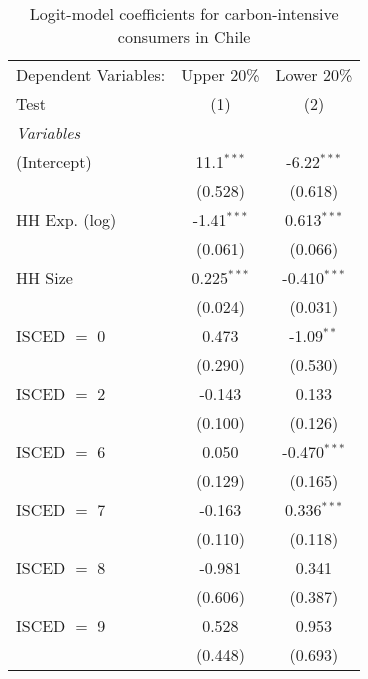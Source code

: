 
\begin{table}[htbp!]
   \centering
   \small
   \begin{adjustbox}{width = 1\textwidth, max height = 0.95\textheight, center}
      \begin{threeparttable}[b]
         \caption{\label{tab:Logit_1_CHL} Logit-model coefficients for carbon-intensive consumers in Chile}
         \begin{tabular}{lcc}
            \tabularnewline \midrule \midrule
            Dependent Variables: & Upper 20\%    & Lower 20\%\\   
            Test                 & (1)           & (2)\\  
            \midrule
            \emph{Variables}\\
            (Intercept)          & 11.1$^{***}$  & -6.22$^{***}$\\   
                                 & (0.528)       & (0.618)\\   
            HH Exp. (log)        & -1.41$^{***}$ & 0.613$^{***}$\\   
                                 & (0.061)       & (0.066)\\   
            HH Size              & 0.225$^{***}$ & -0.410$^{***}$\\   
                                 & (0.024)       & (0.031)\\   
            ISCED $=$ 0          & 0.473         & -1.09$^{**}$\\   
                                 & (0.290)       & (0.530)\\   
            ISCED $=$ 2          & -0.143        & 0.133\\   
                                 & (0.100)       & (0.126)\\   
            ISCED $=$ 6          & 0.050         & -0.470$^{***}$\\   
                                 & (0.129)       & (0.165)\\   
            ISCED $=$ 7          & -0.163        & 0.336$^{***}$\\   
                                 & (0.110)       & (0.118)\\   
            ISCED $=$ 8          & -0.981        & 0.341\\   
                                 & (0.606)       & (0.387)\\   
            ISCED $=$ 9          & 0.528         & 0.953\\   
                                 & (0.448)       & (0.693)\\   

\end{tabular}
\end{threeparttable}
\end{adjustbox}
\end{table}
